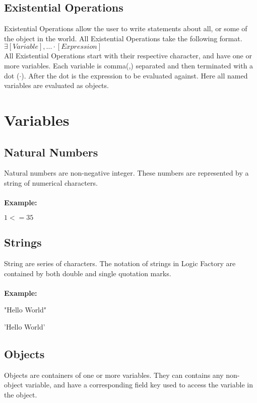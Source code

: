 \documentclass{article}
\begin{document}
	\subsection{Existential Operations}
	
	Existential Operations allow the user to write statements about all, or some of the object in the world. 
	All Existential Operations take the following format. \\
	
	$\exists [Variable],... \cdot [Expression]$\\
	
	All Existential Operations start with their respective character, and have one or more variables. Each variable is comma(,) separated and then terminated with a dot ($\cdot$). After the dot is the expression to be evaluated against. Here all named variables are evaluated as objects.
	
	\newpage
	\section{Variables}
	
	\subsection{Natural Numbers}
	Natural numbers are non-negative integer. These numbers are represented by a string of numerical characters.\\ \\
	\textbf{Example:}
	
	$1 <= 35$
	
	
	\subsection{Strings}
	
	String are series of characters. The notation of strings in Logic Factory are contained by both double and single quotation marks.\\ \\
	\textbf{Example:}
	
	"Hello World"
	
	'Hello World'
	
	\subsection{Objects}
	Objects are containers of one or more variables. They can contains any non-object variable, and have a corresponding field key used to access the variable in the object. \\
	
\end{document}
